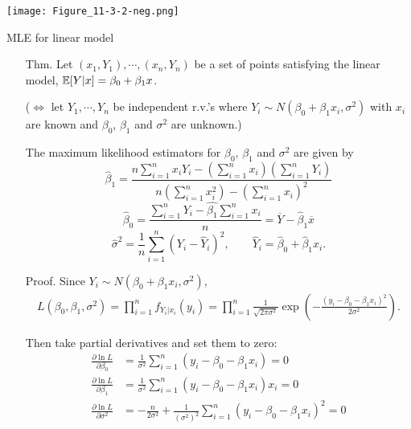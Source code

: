 \begin{frame}
\centering
\texttt{[image: Figure\_11-3-2-neg.png]}
\end{frame}
\begin{frame}{MLE for linear model}

\begin{enumerate}
	\item[Thm.] Let $(x_1,Y_1),\cdots, (x_n,Y_n)$ be a set of points satisfying the linear model, $\mathbb{E}[Y|x]=\beta_0+\beta_1 x$.
		\bigskip
	\item[] ($\Longleftrightarrow$
		let $Y_1,\cdots,Y_n$ be independent r.v.'s where $Y_i\sim N(\beta_0+\beta_1x_i,\sigma^2)$ with $x_i$ are known and $\beta_0$, $\beta_1$ and $\sigma^2$ are unknown.)
		\bigskip
\item[]	The maximum likelihood estimators for $\beta_0$, $\beta_1$ and $\sigma^2$ are given by
	\vfill
\[
\hat\beta_1= \frac{n\sum_{i=1}^n x_iY_i - \left(\sum_{i=1}^n x_i\right)\left(\sum_{i=1}^n Y_i\right)}{n\left(\sum_{i=1}^n x_i^2\right)-\left(\sum_{i=1}^n x_i\right)^2}
\]
\bigskip
\[
\hat\beta_0 =  \frac{\sum_{i=1}^nY_i-\hat{\beta_1}\sum_{i=1}^nx_i}{n} = \overline{Y} - \hat\beta_1 \overline{x}
\]
\medskip
\[
\hat\sigma^2 =  \frac{1}{n}\sum_{i=1}^{n} \left(Y_i-\widehat Y_i \right)^2,\qquad \widehat Y_i = \hat\beta_0 + \hat\beta_1 x_i.
\]
\end{enumerate}
\end{frame}
\begin{frame}[fragile]
\begin{itemize}
	\item[Proof.] Since $Y_i\sim N\left(\beta_0+\beta_1x_i,\sigma^2\right)$,
	\begin{align*}
		L(\beta_0,\beta_1,\sigma^2) = \prod_{i=1}^n f_{Y_i|x_i}(y_i) = \prod_{i=1}^n \frac{1}{\sqrt{2\pi\sigma^2}} \exp\left(-\frac{(y_i-\beta_0-\beta_1x_i)^2}{2\sigma^2}\right).
	\end{align*}
	\item[] Then take partial derivatives and set them to zero:
	\begin{align*}
		\frac{\partial\ln L}{\partial \beta_0} & = \frac{1}{\sigma^2} \sum_{i=1}^n (y_i-\beta_0-\beta_1 x_i) = 0\\
		\frac{\partial\ln L}{\partial \beta_1} & = \frac{1}{\sigma^2} \sum_{i=1}^n (y_i-\beta_0-\beta_1 x_i) x_i = 0\\
		\frac{\partial\ln L}{\partial \sigma^2} & = -\frac{n}{2\sigma^2} + \frac{1}{(\sigma^2)^2} \sum_{i=1}^n (y_i-\beta_0-\beta_1 x_i)^2 =0
	\end{align*}
	\end{itemize}
\end{frame}

